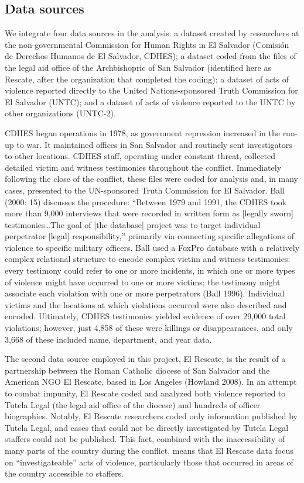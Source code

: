 \documentclass[11pt,]{article}
\begin{document}
\hypertarget{data-sources}{%
\subsection{Data sources}\label{data-sources}}

We integrate four data sources in the analysis: a dataset created by
researchers at the non-governmental Commission for Human Rights in El
Salvador (Comisión de Derechos Humanos de El Salvador, CDHES); a dataset
coded from the files of the legal aid office of the Archbishopric of San
Salvador (identified here as Rescate, after the organization that
completed the coding); a dataset of acts of violence reported directly
to the United Nations-sponsored Truth Commission for El Salvador (UNTC);
and a dataset of acts of violence reported to the UNTC by other
organizations (UNTC-2).

CDHES began operations in 1978, as government repression increased in
the run-up to war. It maintained offices in San Salvador and routinely
sent investigators to other locations. CDHES staff, operating under
constant threat, collected detailed victim and witness testimonies
throughout the conflict. Immediately following the close of the
conflict, these files were coded for analysis and, in many cases,
presented to the UN-sponsored Truth Commission for El Salvador. Ball
(2000: 15) discusses the procedure: ``Between 1979 and 1991, the CDHES
took more than 9,000 interviews that were recorded in written form as
{[}legally sworn{]} testimonies\ldots{}The goal of {[}the database{]}
project was to target individual perpetrator {[}legal{]}
responsibility,'' primarily via connecting specific allegations of
violence to specific military officers. Ball used a FoxPro database with
a relatively complex relational structure to encode complex victim and
witness testimonies: every testimony could refer to one or more
incidents, in which one or more types of violence might have occurred to
one or more victims; the testimony might associate each violation with
one or more perpetrators (Ball 1996). Individual victims and the
locations at which violations occurred were also described and encoded.
Ultimately, CDHES testimonies yielded evidence of over 29,000 total
violations; however, just 4,858 of these were killings or
disappearances, and only 3,668 of these included name, department, and
year data.

The second data source employed in this project, El Rescate, is the
result of a partnership between the Roman Catholic diocese of San
Salvador and the American NGO El Rescate, based in Los Angeles (Howland
2008). In an attempt to combat impunity, El Rescate coded and analyzed
both violence reported to Tutela Legal (the legal aid office of the
diocese) and hundreds of officer biographies. Notably, El Rescate
researchers coded only information published by Tutela Legal, and cases
that could not be directly investigated by Tutela Legal staffers could
not be published. This fact, combined with the inaccessibility of many
parts of the country during the conflict, means that El Rescate data
focus on ``investigateable'' acts of violence, particularly those that
occurred in areas of the country accessible to staffers.
\end{document}
